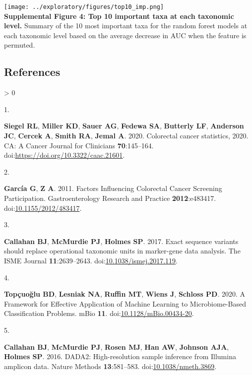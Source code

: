 \documentclass[
]{article}
\newlength{\cslhangindent}
\newlength{\csllabelwidth}
\newenvironment{CSLReferences}[2] %
 {%
  \setlength{\parindent}{0pt}
  \ifodd #1 \everypar{\setlength{\hangindent}{\cslhangindent}}\ignorespaces\fi
  \ifnum #2 > 0
  \setlength{\parskip}{#2\baselineskip}
  \fi
 }%
 {}
\newcommand{\CSLLeftMargin}[1]{\parbox[t]{\csllabelwidth}{#1}}
\newcommand{\CSLRightInline}[1]{\parbox[t]{\linewidth - \csllabelwidth}{#1}\break}
\begin{document}
\newpage

\texttt{[image: ../exploratory/figures/top10\_imp.png]}\\
\textbf{Supplemental Figure 4: Top 10 important taxa at each taxonomic
level.} Summary of the 10 most important taxa for the random forest
models at each taxonomic level based on the average decrease in AUC when
the feature is permuted.

\newpage

\hypertarget{references}{%
\subsection*{References}\label{references}}

\hypertarget{refs}{}
\begin{CSLReferences}{0}{1}
\leavevmode\hypertarget{ref-siegel2020}{}%
\CSLLeftMargin{1. }
\CSLRightInline{\textbf{Siegel RL}, \textbf{Miller KD}, \textbf{Sauer
AG}, \textbf{Fedewa SA}, \textbf{Butterly LF}, \textbf{Anderson JC},
\textbf{Cercek A}, \textbf{Smith RA}, \textbf{Jemal A}. 2020. Colorectal
cancer statistics, 2020. CA: A Cancer Journal for Clinicians
\textbf{70}:145--164. doi:\url{https://doi.org/10.3322/caac.21601}.}

\leavevmode\hypertarget{ref-garcuxeda2011a}{}%
\CSLLeftMargin{2. }
\CSLRightInline{\textbf{García G}, \textbf{Z A}. 2011. Factors
Influencing Colorectal Cancer Screening Participation. Gastroenterology
Research and Practice \textbf{2012}:e483417.
doi:\href{https://doi.org/10.1155/2012/483417}{10.1155/2012/483417}.}

\leavevmode\hypertarget{ref-callahan2017}{}%
\CSLLeftMargin{3. }
\CSLRightInline{\textbf{Callahan BJ}, \textbf{McMurdie PJ},
\textbf{Holmes SP}. 2017. Exact sequence variants should replace
operational taxonomic units in marker-gene data analysis. The ISME
Journal \textbf{11}:2639--2643.
doi:\href{https://doi.org/10.1038/ismej.2017.119}{10.1038/ismej.2017.119}.}

\leavevmode\hypertarget{ref-topuxe7uolu2020}{}%
\CSLLeftMargin{4. }
\CSLRightInline{\textbf{Topçuoğlu BD}, \textbf{Lesniak NA},
\textbf{Ruffin MT}, \textbf{Wiens J}, \textbf{Schloss PD}. 2020. A
Framework for Effective Application of Machine Learning to
Microbiome-Based Classification Problems. mBio \textbf{11}.
doi:\href{https://doi.org/10.1128/mBio.00434-20}{10.1128/mBio.00434-20}.}

\leavevmode\hypertarget{ref-callahan2016}{}%
\CSLLeftMargin{5. }
\CSLRightInline{\textbf{Callahan BJ}, \textbf{McMurdie PJ},
\textbf{Rosen MJ}, \textbf{Han AW}, \textbf{Johnson AJA}, \textbf{Holmes
SP}. 2016. DADA2: High-resolution sample inference from Illumina
amplicon data. Nature Methods \textbf{13}:581--583.
doi:\href{https://doi.org/10.1038/nmeth.3869}{10.1038/nmeth.3869}.}


\end{CSLReferences}
\end{document}
